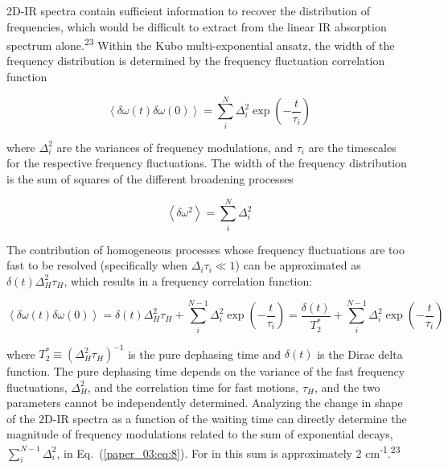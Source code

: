 \documentclass[]{article}
\begin{document}
2D-IR spectra contain sufficient information to recover the distribution of frequencies, which would be difficult to extract from the linear IR absorption spectrum alone.\textsuperscript{23} Within the Kubo multi-exponential ansatz, the width of the frequency distribution is determined by the frequency fluctuation correlation function

\begin{equation}
  \label{paper_03:eq:6}
  \left\langle \delta\omega(t) \delta\omega(0) \right\rangle = \sum_{i}^{N}{\Delta_{i}^{2}\exp\left( - \frac{t}{\tau_{i}} \right)}
\end{equation}

where \(\Delta_{i}^{2}\) are the variances of frequency modulations, and \(\tau_{i}\) are the timescales for the respective frequency fluctuations. The width of the frequency distribution is the sum of squares of the different broadening processes

\begin{equation}
  \label{paper_03:eq:7}
  \left\langle \delta\omega^{2} \right\rangle = \sum_{i}^{N}\Delta_{i}^{2}
\end{equation}

The contribution of homogeneous processes whose frequency fluctuations are too fast to be resolved (specifically when \(\Delta_{i}\tau_{i} \ll 1\)) can be approximated as \(\delta\left( t \right)\Delta_{H}^{2}\tau_{H}\), which results in a frequency correlation function:

\begin{equation}
  \label{paper_03:eq:8}
  \left\langle \delta\omega(t) \delta\omega(0) \right\rangle = \delta\left( t \right)\Delta_{H}^{2}\tau_{H} + \sum_{i}^{N - 1}{\Delta_{i}^{2}\exp\left( - \frac{t}{\tau_{i}} \right)} = \frac{\delta\left( t \right)}{T_{2}^{*}} + \sum_{i}^{N - 1}{\Delta_{i}^{2}\exp\left( - \frac{t}{\tau_{i}} \right)}
\end{equation}

where \(T_{2}^{*} \equiv \left( \Delta_{H}^{2}\tau_{H} \right)^{- 1}\) is the pure dephasing time and \(\delta\left( t \right)\) is the Dirac delta function. The pure dephasing time depends on the variance of the fast frequency fluctuations, \(\Delta_{H}^{2}\), and the correlation time for fast motions, \(\tau_{H}\), and the two parameters cannot be independently determined. Analyzing the change in shape of the 2D-IR spectra as a function of the waiting time can directly determine the magnitude of frequency modulations related to the sum of exponential decays, \(\sum_{i}^{N - 1}\Delta_{i}^{2}\), in Eq.~(\ref{paper_03:eq:8}). For  in \ce{[C4C1im][PF6]} this sum is approximately 2 cm\textsuperscript{-1}.\textsuperscript{23}
\end{document}
